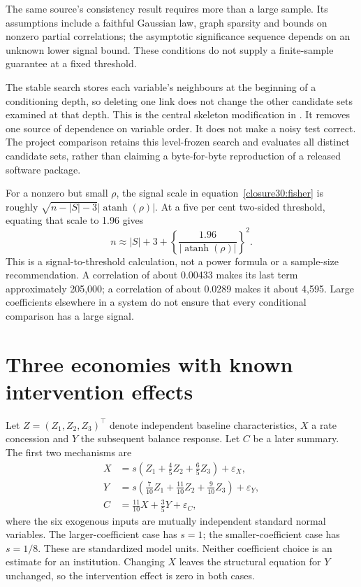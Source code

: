 The same source's consistency result requires more than a large sample. Its
assumptions include a faithful Gaussian law, graph sparsity and bounds on
nonzero partial correlations; the asymptotic significance sequence depends on
an unknown lower signal bound. These conditions do not supply a finite-sample
guarantee at a fixed threshold. \citep[Assumptions A1--A4 and Theorem 1,
pp.~619--620]{kalisch2007}

The stable search stores each variable's neighbours at the beginning of a
conditioning depth, so deleting one link does not change the other candidate
sets examined at that depth. This is the central skeleton modification in
\citet[Section 4.1, Algorithm 4.1 and Theorem 3]{exec13_latentr_colombo2014}. It removes
one source of dependence on variable order. It does not make a noisy test
correct. The project comparison retains this level-frozen search and evaluates
all distinct candidate sets, rather than claiming a byte-for-byte reproduction
of a released software package.

For a nonzero but small $\rho$, the signal scale in
equation~\ref{closure30:fisher} is roughly
$\sqrt{n-|S|-3}|\operatorname{atanh}(\rho)|$. At a five per cent two-sided
threshold, equating that scale to 1.96 gives
\begin{equation}
 n\approx |S|+3+
 \left\{\frac{1.96}{|\operatorname{atanh}(\rho)|}\right\}^{2}.
 \label{closure30:signal-scale}
\end{equation}
This is a signal-to-threshold calculation, not a power formula or a sample-size
recommendation. A correlation of about 0.00433 makes its last term approximately
205,000; a correlation of about 0.0289 makes it about 4,595. Large coefficients
elsewhere in a system do not ensure that every conditional comparison has a
large signal.

\section{Three economies with known intervention effects}

Let $Z=(Z_1,Z_2,Z_3)^\top$ denote independent baseline characteristics,
$X$ a rate concession and $Y$ the subsequent balance response. Let $C$ be a
later summary. The first two mechanisms are
\begin{align}
 X&=s\left(Z_1+\frac45Z_2+\frac65Z_3\right)+\varepsilon_X,\\
 Y&=s\left(\frac7{10}Z_1+\frac{11}{10}Z_2+
                 \frac9{10}Z_3\right)+\varepsilon_Y,\\
 C&=\frac{11}{10}X+\frac35Y+\varepsilon_C,
 \label{closure30:sampling-economy}
\end{align}
where the six exogenous inputs are mutually independent standard normal
variables. The larger-coefficient case has $s=1$; the smaller-coefficient case
has $s=1/8$. These are standardized model units. Neither coefficient choice is
an estimate for an institution. Changing $X$ leaves the structural equation
for $Y$ unchanged, so the intervention effect is zero in both cases.

